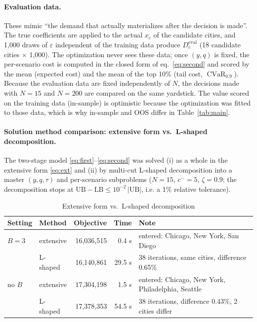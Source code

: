 \documentclass[10pt,a4paper]{article}
\DeclareMathOperator{\CVaR}{CVaR}
\begin{document}
\paragraph{Evaluation data.}
These mimic ``the demand that actually materializes after the decision is made''. The true coefficients are applied to the actual $x_c$ of the candidate cities, and 1{,}000 draws of $\varepsilon$ independent of the training data produce $D^{\mathrm{eval}}_{c}$ (18 candidate cities $\times$ 1{,}000). The optimization never sees these data; once $(y,q)$ is fixed, the per-scenario cost is computed in the closed form of eq.~\eqref{eq:second} and scored by the mean (expected cost) and the mean of the top 10\% (tail cost, $\CVaR_{0.9}$). Because the evaluation data are fixed independently of $N$, the decisions made with $N=15$ and $N=200$ are compared on the same yardstick. The value scored on the training data (in-sample) is optimistic because the optimization was fitted to those data, which is why in-sample and OOS differ in Table~\ref{tab:main}.

\paragraph{Solution method comparison: extensive form vs.\ L-shaped decomposition.}
The two-stage model \eqref{eq:first}--\eqref{eq:second} was solved (i) as a whole in the extensive form \eqref{eq:ext} and (ii) by multi-cut L-shaped decomposition into a master $(y,q,\tau)$ and per-scenario subproblems ($N=15$, $c^-=5$, $\zeta=0.9$; the decomposition stops at $\mathrm{UB}-\mathrm{LB}\le 10^{-2}\,|\mathrm{UB}|$, i.e. a 1\% relative tolerance).

\begin{table}[H]\centering\small
\caption{Extensive form vs.\ L-shaped decomposition}\label{tab:solver}
\begin{tabular}{@{}llrrl@{}}
\toprule
Setting & Method & Objective & Time & Note \\ \midrule
$B=3$ & extensive & 16{,}036{,}515 & 0.4 s & entered: Chicago, New York, San Diego \\
      & L-shaped & 16{,}140{,}861 & 29.5 s & 38 iterations, same cities, difference 0.65\% \\
no $B$ & extensive & 17{,}304{,}198 & 1.5 s & entered: Chicago, New York, Philadelphia, Seattle \\
      & L-shaped & 17{,}378{,}353 & 54.5 s & 38 iterations, difference 0.43\%, 2 cities differ \\
\bottomrule
\end{tabular}
\end{table}
\end{document}
